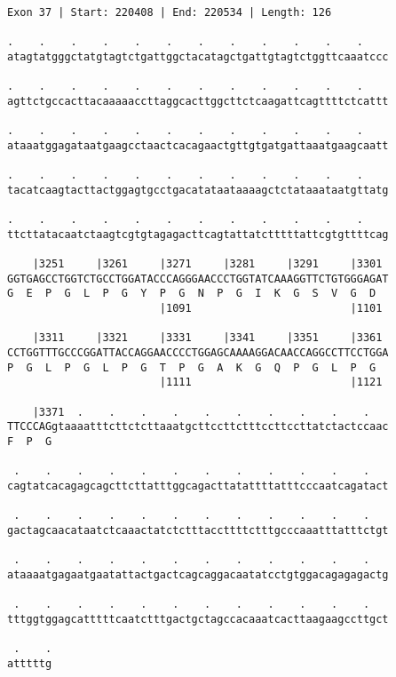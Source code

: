 \documentclass{article}
\begin{document}
\begin{Verbatim}
Exon 37 | Start: 220408 | End: 220534 | Length: 126
 
.    .    .    .    .    .    .    .    .    .    .    .    
atagtatgggctatgtagtctgattggctacatagctgattgtagtctggttcaaatccc
  
.    .    .    .    .    .    .    .    .    .    .    .    
agttctgccacttacaaaaaccttaggcacttggcttctcaagattcagttttctcattt
  
.    .    .    .    .    .    .    .    .    .    .    .    
ataaatggagataatgaagcctaactcacagaactgttgtgatgattaaatgaagcaatt
  
.    .    .    .    .    .    .    .    .    .    .    .    
tacatcaagtacttactggagtgcctgacatataataaaagctctataaataatgttatg
  
.    .    .    .    .    .    .    .    .    .    .    .    
ttcttatacaatctaagtcgtgtagagacttcagtattatctttttattcgtgttttcag
  
    |3251     |3261     |3271     |3281     |3291     |3301 
GGTGAGCCTGGTCTGCCTGGATACCCAGGGAACCCTGGTATCAAAGGTTCTGTGGGAGAT
G  E  P  G  L  P  G  Y  P  G  N  P  G  I  K  G  S  V  G  D  
                        |1091                         |1101 
  
    |3311     |3321     |3331     |3341     |3351     |3361 
CCTGGTTTGCCCGGATTACCAGGAACCCCTGGAGCAAAAGGACAACCAGGCCTTCCTGGA
P  G  L  P  G  L  P  G  T  P  G  A  K  G  Q  P  G  L  P  G  
                        |1111                         |1121 
  
    |3371  .    .    .    .    .    .    .    .    .    .   
TTCCCAGgtaaaatttcttctcttaaatgcttccttctttccttccttatctactccaac
F  P  G                                                     
  
 .    .    .    .    .    .    .    .    .    .    .    .   
cagtatcacagagcagcttcttatttggcagacttatattttatttcccaatcagatact
  
 .    .    .    .    .    .    .    .    .    .    .    .   
gactagcaacataatctcaaactatctctttaccttttctttgcccaaatttatttctgt
  
 .    .    .    .    .    .    .    .    .    .    .    .   
ataaaatgagaatgaatattactgactcagcaggacaatatcctgtggacagagagactg
  
 .    .    .    .    .    .    .    .    .    .    .    .   
tttggtggagcatttttcaatctttgactgctagccacaaatcacttaagaagccttgct
  
 .    .
atttttg
\end{Verbatim}
\newpage
\end{document}
